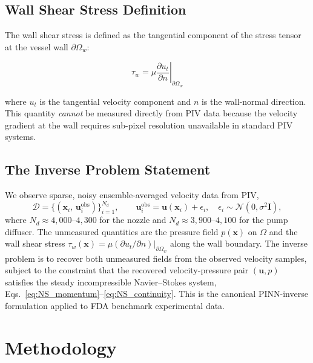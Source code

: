 \documentclass[12pt,a4paper]{article}
\newcommand{\bu}{\bm{u}}          %
\newcommand{\bx}{\bm{x}}          %
\begin{document}
\subsection{Wall Shear Stress Definition}
\label{sec:wss_def}

The wall shear stress is defined as the tangential component of
the stress tensor at the vessel wall $\partial\Omega_w$:

\begin{equation}
  \tau_w = \mu \left.\frac{\partial u_t}{\partial n}\right|_{\partial\Omega_w}
  \label{eq:wss}
\end{equation}

where $u_t$ is the tangential velocity component and $n$ is the
wall-normal direction. This quantity \emph{cannot} be measured
directly from PIV data because the velocity gradient at the wall
requires sub-pixel resolution unavailable in standard PIV systems.

\subsection{The Inverse Problem Statement}
\label{sec:inverse}

We observe sparse, noisy ensemble-averaged velocity data from
PIV,
\begin{equation}
  \mathcal{D} = \{(\bx_i,\,\bu_i^{\text{obs}})\}_{i=1}^{N_d},
  \qquad
  \bu_i^{\text{obs}} = \bu(\bx_i) + \epsilon_i,
  \quad \epsilon_i \sim \mathcal{N}(0, \sigma^2 \bm{I}),
  \label{eq:inverse_data}
\end{equation}
where $N_d \approx 4{,}000$--$4{,}300$ for the nozzle and
$N_d \approx 3{,}900$--$4{,}100$ for the pump diffuser. The
unmeasured quantities are the pressure field $p(\bx)$ on
$\Omega$ and the wall shear stress
$\tau_w(\bx) = \mu (\partial u_t/\partial n)|_{\partial\Omega_w}$
along the wall boundary. The inverse problem is to recover both
unmeasured fields from the observed velocity samples, subject
to the constraint that the recovered velocity-pressure pair
$(\bu, p)$ satisfies the steady incompressible Navier--Stokes
system, Eqs.~\eqref{eq:NS_momentum}--\eqref{eq:NS_continuity}.
This is the canonical PINN-inverse formulation
\cite{Raissi2019PINN1, Raissi2020HFM} applied to FDA
benchmark experimental data.

\section{Methodology}
\label{sec:methods}
\end{document}
